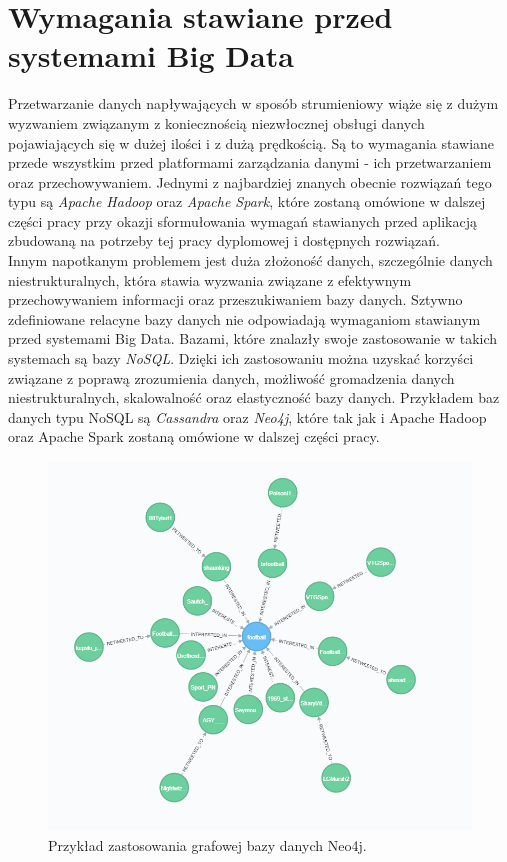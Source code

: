 \section{Wymagania stawiane przed systemami Big Data}
Przetwarzanie danych napływających w sposób strumieniowy wiąże się z dużym wyzwaniem związanym z koniecznością niezwłocznej obsługi danych pojawiających się w dużej ilości i z dużą prędkością. Są to wymagania stawiane przede wszystkim przed platformami zarządzania danymi - ich przetwarzaniem oraz przechowywaniem. Jednymi z najbardziej znanych obecnie rozwiązań tego typu są \textit{Apache Hadoop} oraz \textit{Apache Spark}, które zostaną omówione w dalszej części pracy przy okazji sformułowania wymagań stawianych przed aplikacją zbudowaną na potrzeby tej pracy dyplomowej i dostępnych rozwiązań. \\
Innym napotkanym problemem jest duża złożoność danych, szczególnie danych niestrukturalnych, która stawia wyzwania związane z efektywnym przechowywaniem informacji oraz przeszukiwaniem bazy danych. Sztywno zdefiniowane relacyne bazy danych nie odpowiadają wymaganiom stawianym przed systemami Big Data. Bazami, które znalazły swoje zastosowanie w takich systemach są bazy \textit{NoSQL}. Dzięki ich zastosowaniu można uzyskać korzyści związane z poprawą zrozumienia danych, możliwość gromadzenia danych niestrukturalnych, skalowalność oraz elastyczność bazy danych. Przykładem baz danych typu NoSQL są \textit{Cassandra} oraz \textit{Neo4j}, które tak jak i Apache Hadoop oraz Apache Spark zostaną omówione w dalszej części pracy.

\begin{figure}[h] %
	\centering
	\includegraphics[width=0.8\linewidth]{img/big_data_neo4j}
	\caption{Przykład zastosowania grafowej bazy danych Neo4j.}
\end{figure}

